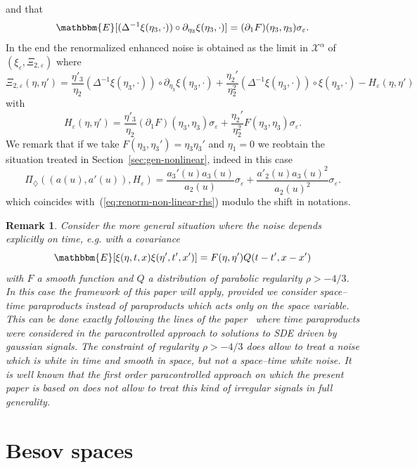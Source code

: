 \documentclass[11pt,reqno]{amsart}
\newtheorem{remark}[theorem]{Remark}
\begin{document}
and that
\[ \mathbbm{E} [(\Delta^{- 1} \xi (\eta_3, \cdot)) \circ \partial_{\eta_3} \xi
   (\eta_3, \cdot)] = (\partial_1 F) (\eta_3, \eta_3) \sigma_{\varepsilon} .
\]
In the end the renormalized enhanced noise is obtained as the limit in
$\mathcal{X}^{\alpha}$ of $(\xi_{\varepsilon}, \Xi_{2, \varepsilon})$ where
\[ \Xi_{2, \varepsilon} (\eta, \eta') = \frac{\eta'_3}{\eta_2} (\Delta^{- 1}
   \xi (\eta_3, \cdot)) \circ \partial_{\eta_3} \xi (\eta_3, \cdot) +
   \frac{\eta_2'}{\eta_2^2} (\Delta^{- 1} \xi (\eta_3, \cdot)) \circ \xi
   (\eta_3, \cdot) - H_{\varepsilon} (\eta, \eta') \]
with
\[ H_{\varepsilon} (\eta, \eta') = \frac{\eta'_3}{\eta_2} (\partial_1 F)
   (\eta_3, \eta_3) \sigma_{\varepsilon} + \frac{\eta_2'}{\eta_2^2} F (\eta_3,
   \eta_3) \sigma_{\varepsilon} . \]
We remark that if we take $F (\eta_3, \eta_3') = \eta_3 \eta_3'$ and $\eta_1 =
0$ we reobtain the situation treated in Section~\ref{sec:gen-nonlinear},
indeed in this case
\[ \Pi_{\diamondsuit} ((a (u), a' (u)), H_{\varepsilon}) = \frac{a_3' (u) a_3
   (u)}{a_2 (u)} \sigma_{\varepsilon} + \frac{a'_2 (u) a_3 (u)^2}{a_2 (u)^2}
   \sigma_{\varepsilon} . \]
which coincides with~(\ref{eq:renorm-non-linear-rhs}) modulo the shift in
notations.

\begin{remark}
  Consider the more general situation where the noise depends explicitly on
  time, e.g. with a covariance
  \[ \mathbbm{E} [\xi (\eta, t, x) \xi (\eta', t', x')] = F (\eta, \eta') Q (t
     - t', x - x') \]
  with $F$ a smooth function and $Q$ a distribution of parabolic regularity
  $\rho > - 4 / 3$. In this case the framework of this paper will apply,
  provided we consider space--time paraproducts instead of paraproducts which
  acts only on the space variable. This can be done exactly following the
  lines of the paper~{\cite{gubinelli_paracontrolled_2015}} where time
  paraproducts were considered in the paracontrolled approach to solutions to
  SDE driven by gaussian signals. The constraint of regularity $\rho > - 4 /
  3$ does allow to treat a noise which is white in time and smooth in space,
  but not a space--time white noise. It is well known that the first order
  paracontrolled approach on which the present paper is based on does not
  allow to treat this kind of irregular signals in full generality.
\end{remark}

\appendix\section{Besov spaces}\label{appendix:besov}
\end{document}
